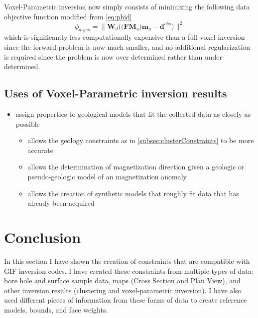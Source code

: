 Voxel-Parametric inversion now simply consists of minimizing the following data objective function modified from \autoref{eq:phid}
\begin{equation}
\phi_{d\text{-}geo} =\|\mathbf W_d\Big(\big(\mathbf F\mathbf M_g\big)\mathbf m_g - \mathbf d^{obs}\Big)\|^2
\end{equation}
\label{eq:phidGeo}
which is significantly less computationally expensive than a full voxel inversion since the forward problem is now much smaller, and no additional regularization is required since the problem is now over determined rather than under-determined.

\subsection{Uses of Voxel-Parametric inversion results}
\label{subsec:voxelParamUses}

 \begin{itemize}
  \item assign properties to geological models that fit the collected data as closely as possible
  \begin{itemize}
   \item allows the geology constraints as in \autoref{subsec:clusterConstraints} to be more accurate
   \item allows the determination of magnetization direction given a geologic or pseudo-geologic model of an magnetization anomaly   
   \item allows the creation of synthetic models that roughly fit data that has already been acquired
  \end{itemize}
 \end{itemize}

\section{Conclusion}
\label{sec:GIFtoolsConc}

In this section I have shown the creation of constraints that are compatible with \ac{GIF} inversion codes. I have created these constraints from multiple types of data: bore hole and surface sample data, maps (Cross Section and Plan View), and other inversion results (clustering and voxel-parametric inversion). I have also  used different pieces of information from these forms of data to create reference models, bounds, and face weights.



%

\endinput

Any text after an \endinput is ignored.
You could put scraps here or things in progress.
